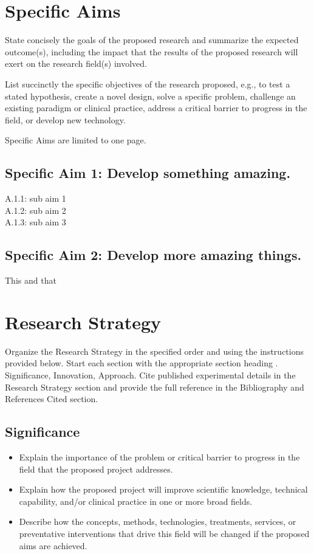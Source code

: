 \documentclass[11pt]{article}  %
\newcommand{\inden}[1]{\mbox{} \hspace{#1} } %
\begin{document}
\pagestyle{empty}

\section{Specific Aims}
State concisely the goals of the proposed research and summarize the expected outcome(s), 
including the impact that the results of the proposed research will exert on the research field(s) involved.

List succinctly the specific objectives of the research proposed, e.g., to test a stated hypothesis, 
create a novel design, solve a specific problem, challenge an existing paradigm or clinical practice, 
address a critical barrier to progress in the field, or develop new technology.

Specific Aims are limited to one page.

\subsection{Specific Aim 1: Develop something amazing.}
\inden{2em}   A.1.1: sub aim 1\\
\inden{2em} A.1.2: sub aim 2\\
\inden{2em}   A.1.3: sub aim 3

\subsection{Specific Aim 2: Develop more amazing things.}
This and that

\section{Research Strategy}
Organize the Research Strategy in the specified order and using the instructions provided below. 
Start each section with the appropriate section heading . Significance, Innovation, Approach. 
Cite published experimental details in the Research Strategy section and provide the full reference 
in the Bibliography and References Cited section.

\subsection{Significance}

\begin{itemize}
\item Explain the importance of the problem or critical barrier to progress in the field 
that the proposed project addresses.
\item Explain how the proposed project will improve scientific knowledge, technical capability, 
and/or clinical practice in one or more broad fields.
\item Describe how the concepts, methods, technologies, treatments, services, 
or preventative interventions that drive this field will be changed if the proposed aims are achieved.
\end{itemize}
\end{document}
